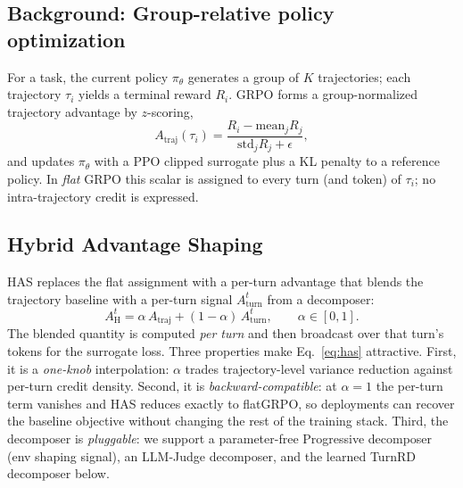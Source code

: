 \documentclass{article}
\newcommand{\Atraj}{A_{\text{traj}}}
\newcommand{\Aturn}{A_{\text{turn}}}
\newcommand{\AH}{A_{\text{H}}}
\begin{document}
\subsection{Background: Group-relative policy optimization}
For a task, the current policy $\pi_\theta$ generates a group of $K$ trajectories; each
trajectory $\tau_i$ yields a terminal reward $R_i$. GRPO forms a group-normalized trajectory
advantage by $z$-scoring,
\begin{equation}
\Atraj(\tau_i) = \frac{R_i - \mathrm{mean}_j R_j}{\mathrm{std}_j R_j + \epsilon},
\end{equation}
and updates $\pi_\theta$ with a PPO clipped surrogate plus a KL penalty to a reference policy.
In \emph{flat} GRPO this scalar is assigned to every turn (and token) of $\tau_i$; no
intra-trajectory credit is expressed.

\subsection{Hybrid Advantage Shaping}
HAS replaces the flat assignment with a per-turn advantage that blends the trajectory baseline
with a per-turn signal $\Aturn^{t}$ from a decomposer:
\begin{equation}
\AH^{t} = \alpha\,\Atraj + (1-\alpha)\,\Aturn^{t},
\qquad \alpha \in [0,1].
\label{eq:has}
\end{equation}
The blended quantity is computed \emph{per turn} and then broadcast over that turn's tokens
for the surrogate loss. Three properties make Eq.~\eqref{eq:has} attractive. First, it is a
\emph{one-knob} interpolation: $\alpha$ trades trajectory-level variance reduction against
per-turn credit density. Second, it is \emph{backward-compatible}: at $\alpha{=}1$ the
per-turn term vanishes and HAS
reduces exactly to flatGRPO, so deployments can recover the baseline objective without
changing the rest of the training stack. Third, the decomposer is \emph{pluggable}: we support
a parameter-free Progressive decomposer (env shaping signal), an LLM-Judge decomposer, and the
learned TurnRD decomposer below.
\end{document}

